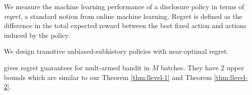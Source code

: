 We measure the machine learning performance of a disclosure policy in terms of \emph{regret}, a standard notion from online machine learning. Regret is defined as the difference in the total expected reward between the best fixed action and actions induced by the policy.

We design transitive unbiased-subhistory policies with near-optimal regret. 









\cite{Perchet2015BatchedBP} gives regret guarantees for mult-armed bandit in $M$ batches. They have 2 upper bounds which are similar to our Theorem \ref{thm:llevel-1} and Theorem \ref{thm:llevel-2}.
